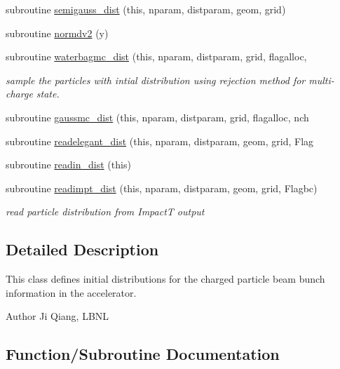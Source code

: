\begin{DoxyCompactItemize}
subroutine \mbox{\hyperlink{namespacedistributionclass_a0e031187f6b2818aebcd2911b93c0722}{semigauss\+\_\+dist}} (this, nparam, distparam, geom, grid)
\item 
subroutine \mbox{\hyperlink{namespacedistributionclass_a020961b4717af242fc3c82090a17ce12}{normdv2}} (y)
\item 
subroutine \mbox{\hyperlink{namespacedistributionclass_a50c29600de2efb52342fa5b2e2e21283}{waterbagmc\+\_\+dist}} (this, nparam, distparam, grid, flagalloc,
\begin{DoxyCompactList}\small\item\em sample the particles with intial distribution using rejection method for multi-\/charge state. \end{DoxyCompactList}\item 
subroutine \mbox{\hyperlink{namespacedistributionclass_ae3590d26a730b67c67e6e6597196f4bd}{gaussmc\+\_\+dist}} (this, nparam, distparam, grid, flagalloc, nch
\item 
subroutine \mbox{\hyperlink{namespacedistributionclass_acf080fd52aac8287d955bcfd88362c07}{readelegant\+\_\+dist}} (this, nparam, distparam, geom, grid, Flag
\item 
subroutine \mbox{\hyperlink{namespacedistributionclass_a4efaf82e4273159a0e2651238502bbf2}{readin\+\_\+dist}} (this)
\item 
subroutine \mbox{\hyperlink{namespacedistributionclass_ab1d0719de2c779c9d5e8a5f353555193}{readimpt\+\_\+dist}} (this, nparam, distparam, geom, grid, Flagbc)
\begin{DoxyCompactList}\small\item\em read particle distribution from ImpactT output \end{DoxyCompactList}\end{DoxyCompactItemize}


\subsection{Detailed Description}
This class defines initial distributions for the charged particle beam bunch information in the accelerator. 

\begin{DoxyAuthor}{Author}
Ji Qiang, L\+B\+NL 
\end{DoxyAuthor}


\subsection{Function/\+Subroutine Documentation}
\mbox{\label{namespacedistributionclass_af85f956a3fdb677022a546bc69ecfb3c}} 
